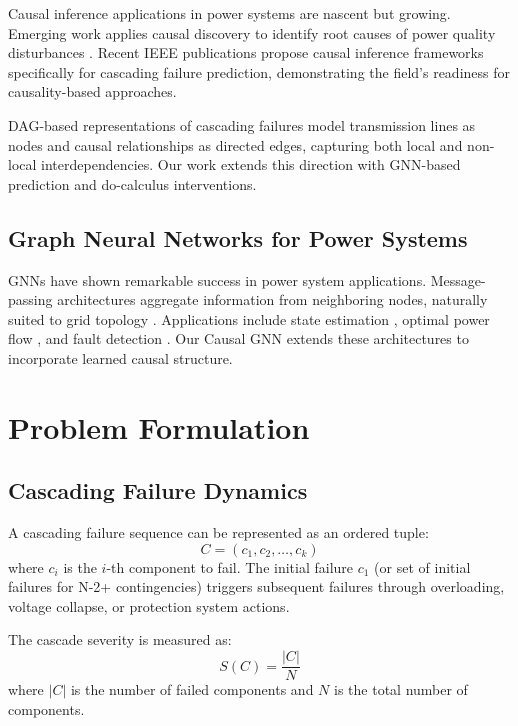 \documentclass[journal,12pt,onecolumn]{IEEEtran}
\begin{document}
Causal inference applications in power systems are nascent but growing. Emerging work applies causal discovery to identify root causes of power quality disturbances \cite{ref9}. Recent IEEE publications \cite{ref10} propose causal inference frameworks specifically for cascading failure prediction, demonstrating the field's readiness for causality-based approaches.

DAG-based representations of cascading failures \cite{ref11} model transmission lines as nodes and causal relationships as directed edges, capturing both local and non-local interdependencies. Our work extends this direction with GNN-based prediction and do-calculus interventions.

\subsection{Graph Neural Networks for Power Systems}

GNNs have shown remarkable success in power system applications. Message-passing architectures aggregate information from neighboring nodes, naturally suited to grid topology \cite{ref12}. Applications include state estimation \cite{ref13}, optimal power flow \cite{ref14}, and fault detection \cite{ref15}. Our Causal GNN extends these architectures to incorporate learned causal structure.

\section{Problem Formulation}
\label{sec:problem}

\subsection{Cascading Failure Dynamics}

A cascading failure sequence can be represented as an ordered tuple:
\begin{equation}
C = (c_1, c_2, \ldots, c_k)
\label{eq:cascade}
\end{equation}
where $c_i$ is the $i$-th component to fail. The initial failure $c_1$ (or set of initial failures for N-2+ contingencies) triggers subsequent failures through overloading, voltage collapse, or protection system actions.

The cascade severity is measured as:
\begin{equation}
S(C) = \frac{|C|}{N}
\label{eq:severity}
\end{equation}
where $|C|$ is the number of failed components and $N$ is the total number of components.
\end{document}
